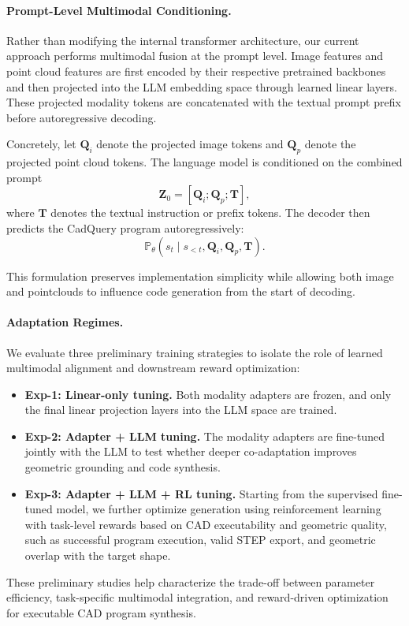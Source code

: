 \documentclass{article}
\begin{document}
\paragraph{Prompt-Level Multimodal Conditioning.}
Rather than modifying the internal transformer architecture, our current approach performs multimodal fusion at the prompt level. Image features and point cloud features are first encoded by their respective pretrained backbones and then projected into the LLM embedding space through learned linear layers. These projected modality tokens are concatenated with the textual prompt prefix before autoregressive decoding.

Concretely, let $\mathbf{Q}_{i}$ denote the projected image tokens and $\mathbf{Q}_{p}$ denote the projected point cloud tokens. The language model is conditioned on the combined prompt
\begin{equation}
\mathbf{Z}_0 = [\mathbf{Q}_{i}; \mathbf{Q}_{p}; \mathbf{T}],
\end{equation}
where $\mathbf{T}$ denotes the textual instruction or prefix tokens. The decoder then predicts the CadQuery program autoregressively:
\begin{equation}
\mathbb{P}_{\theta}(s_t \mid s_{<t}, \mathbf{Q}_{i}, \mathbf{Q}_{p}, \mathbf{T}).
\end{equation}

This formulation preserves implementation simplicity while allowing both image and pointclouds to influence code generation from the start of decoding. 

\paragraph{Adaptation Regimes.}
We evaluate three preliminary training strategies to isolate the role of learned multimodal alignment and downstream reward optimization:
\begin{itemize}
    \item \textbf{Exp-1: Linear-only tuning.} Both modality adapters are frozen, and only the final linear projection layers into the LLM space are trained.
    \item \textbf{Exp-2: Adapter + LLM tuning.} The modality adapters are fine-tuned jointly with the LLM to test whether deeper co-adaptation improves geometric grounding and code synthesis.
    \item \textbf{Exp-3: Adapter + LLM + RL tuning.} Starting from the supervised fine-tuned model, we further optimize generation using reinforcement learning with task-level rewards based on CAD executability and geometric quality, such as successful program execution, valid STEP export, and geometric overlap with the target shape.
\end{itemize}
These preliminary studies help characterize the trade-off between parameter efficiency, task-specific multimodal integration, and reward-driven optimization for executable CAD program synthesis.
\end{document}

